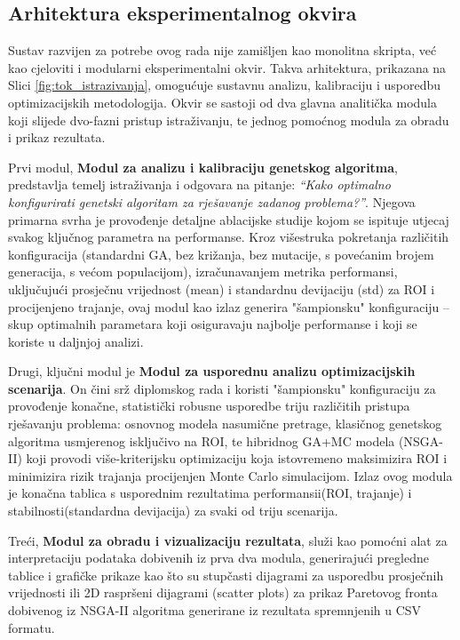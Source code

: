 \subsection{Arhitektura eksperimentalnog okvira}

Sustav razvijen za potrebe ovog rada nije zamišljen kao monolitna skripta, već kao cjeloviti i modularni eksperimentalni okvir. Takva arhitektura, prikazana na Slici \ref{fig:tok_istrazivanja}, omogućuje sustavnu analizu, kalibraciju i usporedbu optimizacijskih metodologija. Okvir se sastoji od dva glavna analitička modula koji slijede dvo-fazni pristup istraživanju, te jednog pomoćnog modula za obradu i prikaz rezultata.

Prvi modul, \textbf{Modul za analizu i kalibraciju genetskog algoritma}, predstavlja temelj istraživanja i odgovara na pitanje: \emph{``Kako optimalno konfigurirati genetski algoritam za rješavanje zadanog problema?''}. Njegova primarna svrha je provođenje detaljne ablacijske studije kojom se ispituje utjecaj svakog ključnog parametra na performanse. Kroz višestruka pokretanja različitih konfiguracija (standardni GA, bez križanja, bez mutacije, s povećanim brojem generacija, s većom populacijom), izračunavanjem metrika performansi, uključujući prosječnu vrijednost (mean) i standardnu devijaciju (std) za ROI i procijenjeno trajanje, ovaj modul kao izlaz generira "šampionsku" konfiguraciju – skup optimalnih parametara koji osiguravaju najbolje performanse i koji se koriste u daljnjoj analizi.

    Drugi, ključni modul je \textbf{Modul za usporednu analizu optimizacijskih scenarija}. On čini srž diplomskog rada i koristi "šampionsku" konfiguraciju za provođenje konačne, statistički robusne usporedbe triju različitih pristupa rješavanju problema: osnovnog modela nasumične pretrage, klasičnog genetskog algoritma usmjerenog isključivo na ROI, te hibridnog GA+MC modela (NSGA-II) koji provodi više-kriterijsku optimizaciju koja istovremeno maksimizira ROI i minimizira rizik trajanja procijenjen Monte Carlo simulacijom.  Izlaz ovog modula je konačna tablica s usporednim rezultatima performansii(ROI, trajanje) i stabilnosti(standardna devijacija) za svaki od triju scenarija.

    Treći, \textbf{Modul za obradu i vizualizaciju rezultata}, služi kao pomoćni alat za interpretaciju podataka dobivenih iz prva dva modula, generirajući pregledne tablice i grafičke prikaze kao što su stupčasti dijagrami za usporedbu prosječnih vrijednosti ili 2D raspršeni dijagrami (scatter plots) za prikaz Paretovog fronta dobivenog iz NSGA-II algoritma generirane iz rezultata spremnjenih u CSV formatu.

